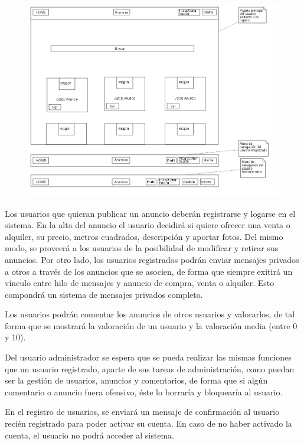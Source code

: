 \begin{figure}[h]
\centering
\includegraphics[width=.9\textwidth]{Img/VisionAplicacion/vision_1.jpg}
\end{figure}

Los usuarios que quieran publicar un anuncio deber\'{a}n registrarse y logarse en el sistema. En la alta del anuncio el usuario decidir\'{a} si quiere ofrecer una venta o alquiler, su precio, metros cuadrados, descripci\'{o}n y aportar fotos. Del mismo modo, se proveer\'{a} a los usuarios de la posibilidad de modificar y retirar sus anuncios. Por otro lado, los usuarios registrados podr\'{a}n enviar mensajes privados a otros a trav\'{e}s de los anuncios que se asocien, de forma que siempre exitir\'{a} un v\'{i}nculo entre hilo de mensajes y anuncio de compra, venta o alquiler. Esto compondr\'{a} un sistema de mensajes privados completo.

Los usuarios podr\'{a}n comentar los anuncios de otros usuarios y valorarlos, de tal forma que se mostrar\'{a} la valoraci\'{o}n de un usuario y la valoraci\'{o}n media (entre 0 y 10).


Del usuario administrador se espera que se pueda realizar las mismas funciones que un usuario registrado, aparte de sus tareas de administraci\'{o}n, como puedan ser la gesti\'{o}n de usuarios, anuncios y comentarios, de forma que si alg\'{u}n comentario o anuncio fuera ofensivo, \'{e}ste lo borrar\'{i}a y bloquear\'{i}a al usuario.

En el registro de usuarios, se enviar\'{a} un mensaje de confirmaci\'{o}n al usuario reci\'{e}n registrado para poder activar su cuenta. En caso de no haber activado la cuenta, el usuario no podr\'{a} acceder al sistema. 

